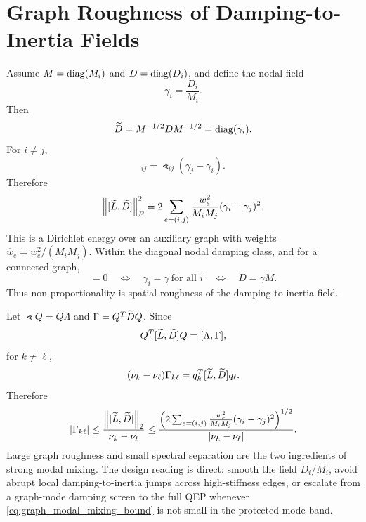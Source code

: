 \section{Graph Roughness of Damping-to-Inertia Fields}

Assume \(M=\operatorname{diag}(M_i)\) and \(D=\operatorname{diag}(D_i)\), and define the nodal field
\begin{equation}
  \gamma_i=\frac{D_i}{M_i}.
  \label{eq:graph_gamma_field}
\end{equation}
Then
\begin{equation}
  \widetilde D=M^{-1/2}DM^{-1/2}=\operatorname{diag}(\gamma_i).
  \label{eq:graph_Dt_gamma}
\end{equation}
For \(i\ne j\),
\begin{equation}
  [\Lt,\Dt]_{ij}
  =
  \Lt_{ij}(\gamma_j-\gamma_i).
  \label{eq:graph_commutator_entry}
\end{equation}
Therefore
\begin{equation}
  \left\lVert [\widetilde L,\widetilde D] \right\rVert_F^2
  =
  2\sum_{e=(i,j)}
  \frac{w_e^2}{M_iM_j}
  (\gamma_i-\gamma_j)^2.
  \label{eq:graph_roughness_identity}
\end{equation}
This is a Dirichlet energy over an auxiliary graph with weights
\(\widehat w_e=w_e^2/(M_iM_j)\). Within the diagonal nodal damping class, and
for a connected graph,
\begin{equation}
  [\Lt,\Dt]=0
  \quad\Longleftrightarrow\quad
  \gamma_i=\gamma\ \text{for all }i
  \quad\Longleftrightarrow\quad
  D=\gamma M.
  \label{eq:graph_diagonal_commuting_iff}
\end{equation}
Thus non-proportionality is spatial roughness of the damping-to-inertia field.

Let \(\Lt Q=Q\Lambda\) and \(\Gamma=Q^T\widetilde D Q\). Since
\begin{equation}
  Q^T[\widetilde L,\widetilde D]Q=[\Lambda,\Gamma],
  \label{eq:graph_commutator_modal}
\end{equation}
for \(k\ne\ell\),
\begin{equation}
  (\nu_k-\nu_\ell)\Gamma_{k\ell}
  =
  q_k^T[\widetilde L,\widetilde D]q_\ell.
  \label{eq:graph_modal_coupling_identity}
\end{equation}
Therefore
\begin{equation}
  |\Gamma_{k\ell}|
  \le
  \frac{\left\lVert [\widetilde L,\widetilde D] \right\rVert_2}{|\nu_k-\nu_\ell|}
  \le
  \frac{
  \left(
  2\sum_{e=(i,j)}
  \frac{w_e^2}{M_iM_j}(\gamma_i-\gamma_j)^2
  \right)^{1/2}}
  {|\nu_k-\nu_\ell|}.
  \label{eq:graph_modal_mixing_bound}
\end{equation}
Large graph roughness and small spectral separation are the two ingredients of
strong modal mixing. The design reading is direct: smooth the field
\(D_i/M_i\), avoid abrupt local damping-to-inertia jumps across high-stiffness
edges, or escalate from a graph-mode damping screen to the full QEP whenever
\eqref{eq:graph_modal_mixing_bound} is not small in the protected mode band.


